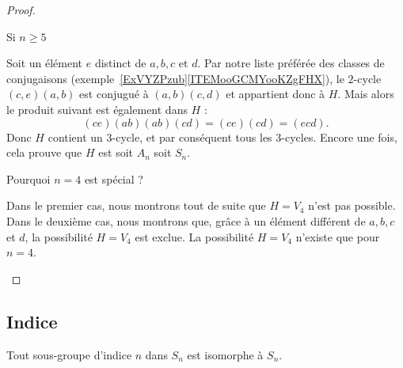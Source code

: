 \begin{proof}
\begin{subproof}
\begin{subproof}
                \item[Si \( n\geq 5\)]

                    Soit un élément \( e\) distinct de \( a,b,c\) et \( d\). Par notre liste préférée des classes de conjugaisons (exemple~\ref{ExVYZPzub}\ref{ITEMooGCMYooKZgFHX}), le \( 2\)-cycle \( (c,e)(a,b)\) est conjugué à \( (a,b)(c,d)\) et appartient donc à \( H\). Mais alors le produit suivant est également dans \( H\) :
                    \begin{equation}
                        (ce)(ab)(ab)(cd)=(ce)(cd)=(ecd).
                    \end{equation}
                    Donc \( H\) contient un \( 3\)-cycle, et par conséquent tous les \( 3\)-cycles. Encore une fois, cela prouve que \( H\) est soit \( A_n\) soit \( S_n\).

        \item[Pourquoi \( n=4\) est spécial ?]

            Dans le premier cas, nous montrons tout de suite que \( H=V_4\) n'est pas possible. Dans le deuxième cas, nous montrons que, grâce à un élément différent de \( a,b,c\) et \( d\), la possibilité \( H=V_4\) est exclue. La possibilité \( H=V_4\) n'existe que pour \( n=4\).

    \end{subproof}
    \end{subproof}

\end{proof}

\subsection{Indice}

\begin{theorem}
    Tout sous-groupe d'indice \( n\) dans \( S_n\) est isomorphe à \( S_n\).
\end{theorem}


